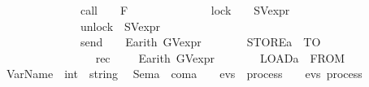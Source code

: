 \begin{isabellebody}
\ \ \ \ \ \ \ \ \ \ \ \ \ {\isacharbar}{\kern0pt}\ call\ \ \ \ F\isanewline
\isanewline
\ \ \ \ \ \ \ \ \ \ \ \ \ {\isacharbar}{\kern0pt}\ lock\ \ \ \ SV\isactrlsub e\isactrlsub x\isactrlsub p\isactrlsub r\isanewline
\ \ \ \ \ \ \ \ \ \ \ \ \ {\isacharbar}{\kern0pt}\ unlock\ \ SV\isactrlsub e\isactrlsub x\isactrlsub p\isactrlsub r\ \ \ \ \ \ \ \ \ \ \ \ \isanewline
\ \ \ \ \ \ \ \ \ \ \ \ \ {\isacharbar}{\kern0pt}\ send\ \ \ \ E\isactrlsub a\isactrlsub r\isactrlsub i\isactrlsub t\isactrlsub h\ GV\isactrlsub e\isactrlsub x\isactrlsub p\isactrlsub r\ \ \ \ \ \ \ \ {\isacharparenleft}{\kern0pt}{\isachardoublequoteopen}STORE\isactrlsub a\ {\isacharunderscore}{\kern0pt}\ TO\ \ {\isacharunderscore}{\kern0pt}{\isachardoublequoteclose}\ {\isacharbrackleft}{\kern0pt}{}{}{\isacharcomma}{\kern0pt}{}{}{\isacharbrackright}{\kern0pt}{}{}{\isacharparenright}{\kern0pt}\ \ \ \ \ \ \ \ \ \ \ \ \ \ \isanewline
\ \ \ \ \ \ \ \ \ \ \ \ \ {\isacharbar}{\kern0pt}\ rec\ \ \ \ \ E\isactrlsub a\isactrlsub r\isactrlsub i\isactrlsub t\isactrlsub h\ GV\isactrlsub e\isactrlsub x\isactrlsub p\isactrlsub r\ \ \ \ \ \ \ \ {\isacharparenleft}{\kern0pt}{\isachardoublequoteopen}LOAD\isactrlsub a\ {\isacharunderscore}{\kern0pt}\ FROM\ {\isacharunderscore}{\kern0pt}{\isachardoublequoteclose}\ {\isacharbrackleft}{\kern0pt}{}{}{\isacharcomma}{\kern0pt}{}{}{\isacharbrackright}{\kern0pt}{}{}{\isacharparenright}{\kern0pt}%
\isadelimdocument
%
\endisadelimdocument
%
\isatagdocument
%
\isamarkuptrue%
%
\endisatagdocument
{\isafolddocument}%
%
\isadelimdocument
%
\endisadelimdocument
{}\isamarkupfalse%
\ VarName\ {\isacharcolon}{\kern0pt}{\isacharcolon}{\kern0pt}\ {\isacartoucheopen}int\ {\isasymRightarrow}\ string{\isacartoucheclose}\ %
\isanewline
\isanewline
{}\isamarkupfalse%
\ Sem\isactrlsub a\ {\isacharcolon}{\kern0pt}{\isacharcolon}{\kern0pt}\ {\isachardoublequoteopen}com\isactrlsub a\ {\isasymRightarrow}\ {\isacharparenleft}{\kern0pt}{\isasymsigma}\ {\isasymRightarrow}\ evs\ \ process{\isacharparenright}{\kern0pt}\ {\isasymRightarrow}\ {\isasymsigma}\ {\isasymRightarrow}\ evs\ process{\isachardoublequoteclose}\ \isanewline

\end{isabellebody}
